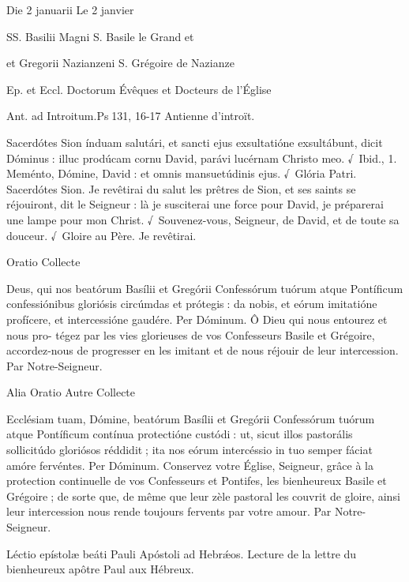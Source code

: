 \begin{paracol}{2}

Die 2 januarii
\switchcolumn
Le 2 janvier
\switchcolumn*

SS. Basilii Magni
\switchcolumn
S. Basile le Grand et
\switchcolumn*

et Gregorii Nazianzeni
\switchcolumn
S. Grégoire de Nazianze
\switchcolumn*

Ep. et Eccl. Doctorum
\switchcolumn
Évêques et Docteurs de l’Église
\switchcolumn*

Ant. ad Introitum.\hfill Ps 131, 16-17
\switchcolumn
Antienne d’introït.
\switchcolumn*

Sacerdótes Sion índuam salutári, et sancti ejus exsultatióne exsultábunt, dicit Dóminus : illuc prodúcam cornu David, parávi lucérnam Christo meo. √~Ibid., 1. Meménto, Dómine, David : et omnis mansuetúdinis ejus. √~Glória Patri. Sacerdótes Sion.
\switchcolumn
Je revêtirai du salut les prêtres de Sion, et  ses saints se réjouiront, dit le Seigneur : là je susciterai une force pour David, je préparerai une lampe pour mon Christ. √~Souvenez-vous, Seigneur, de David, et de toute sa douceur. √~Gloire au Père. Je revêtirai.
\switchcolumn*

Oratio
\switchcolumn
Collecte
\switchcolumn*

Deus, qui nos beatórum Basílii et  Gregórii Confessórum tuórum atque Pontíficum confessiónibus gloriósis circúmdas et prótegis : da nobis, et eórum imitatióne profícere, et intercessióne gaudére. Per Dóminum.
\switchcolumn
Ô Dieu qui nous entourez et nous pro- tégez par les vies glorieuses de vos Confesseurs Basile et Grégoire, accordez-nous de progresser en les imitant et de nous réjouir de leur intercession. Par Notre-Seigneur.
\switchcolumn*

Alia Oratio
\switchcolumn
Autre Collecte
\switchcolumn*

Ecclésiam tuam, Dómine, beatórum Basílii et Gregórii Confessórum tuórum atque Pontíficum contínua protectióne custódi : ut, sicut illos pastorális sollicitúdo gloriósos réddidit ; ita nos eórum intercéssio in tuo semper fáciat amóre fervéntes. Per Dóminum.
\switchcolumn
Conservez votre Église, Seigneur, grâce à la protection continuelle de vos Confesseurs et Pontifes, les bienheureux Basile et Grégoire ; de sorte que, de même que leur zèle pastoral les couvrit de gloire, ainsi leur intercession nous rende toujours fervents par votre amour. Par Notre-Seigneur.
\switchcolumn*

Léctio epístolæ beáti Pauli Apóstoli ad Hebrǽos.
\switchcolumn
Lecture de la lettre du bienheureux apôtre Paul aux Hébreux.
\switchcolumn*


\end{paracol}
